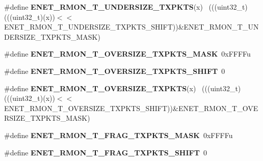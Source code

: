 \begin{DoxyCompactItemize}
\item 
\hypertarget{group___e_n_e_t___register___masks_ga293c77a598841c77f6650e48c81efbba}{}\#define {\bfseries E\+N\+E\+T\+\_\+\+R\+M\+O\+N\+\_\+\+T\+\_\+\+U\+N\+D\+E\+R\+S\+I\+Z\+E\+\_\+\+T\+X\+P\+K\+T\+S}(x)                ~(((uint32\+\_\+t)(((uint32\+\_\+t)(x))$<$$<$E\+N\+E\+T\+\_\+\+R\+M\+O\+N\+\_\+\+T\+\_\+\+U\+N\+D\+E\+R\+S\+I\+Z\+E\+\_\+\+T\+X\+P\+K\+T\+S\+\_\+\+S\+H\+I\+F\+T))\&E\+N\+E\+T\+\_\+\+R\+M\+O\+N\+\_\+\+T\+\_\+\+U\+N\+D\+E\+R\+S\+I\+Z\+E\+\_\+\+T\+X\+P\+K\+T\+S\+\_\+\+M\+A\+S\+K)\label{group___e_n_e_t___register___masks_ga293c77a598841c77f6650e48c81efbba}

\item 
\hypertarget{group___e_n_e_t___register___masks_gac24da13e75404927ddc2e7a9f1dc9134}{}\#define {\bfseries E\+N\+E\+T\+\_\+\+R\+M\+O\+N\+\_\+\+T\+\_\+\+O\+V\+E\+R\+S\+I\+Z\+E\+\_\+\+T\+X\+P\+K\+T\+S\+\_\+\+M\+A\+S\+K}~0x\+F\+F\+F\+Fu\label{group___e_n_e_t___register___masks_gac24da13e75404927ddc2e7a9f1dc9134}

\item 
\hypertarget{group___e_n_e_t___register___masks_gaa57896dafe9204df8f2d835281f03114}{}\#define {\bfseries E\+N\+E\+T\+\_\+\+R\+M\+O\+N\+\_\+\+T\+\_\+\+O\+V\+E\+R\+S\+I\+Z\+E\+\_\+\+T\+X\+P\+K\+T\+S\+\_\+\+S\+H\+I\+F\+T}~0\label{group___e_n_e_t___register___masks_gaa57896dafe9204df8f2d835281f03114}

\item 
\hypertarget{group___e_n_e_t___register___masks_ga60cf462bbd7463ebe34b0980457bf1cf}{}\#define {\bfseries E\+N\+E\+T\+\_\+\+R\+M\+O\+N\+\_\+\+T\+\_\+\+O\+V\+E\+R\+S\+I\+Z\+E\+\_\+\+T\+X\+P\+K\+T\+S}(x)                  ~(((uint32\+\_\+t)(((uint32\+\_\+t)(x))$<$$<$E\+N\+E\+T\+\_\+\+R\+M\+O\+N\+\_\+\+T\+\_\+\+O\+V\+E\+R\+S\+I\+Z\+E\+\_\+\+T\+X\+P\+K\+T\+S\+\_\+\+S\+H\+I\+F\+T))\&E\+N\+E\+T\+\_\+\+R\+M\+O\+N\+\_\+\+T\+\_\+\+O\+V\+E\+R\+S\+I\+Z\+E\+\_\+\+T\+X\+P\+K\+T\+S\+\_\+\+M\+A\+S\+K)\label{group___e_n_e_t___register___masks_ga60cf462bbd7463ebe34b0980457bf1cf}

\item 
\hypertarget{group___e_n_e_t___register___masks_ga165675b1bc4ead102b209af312a64e30}{}\#define {\bfseries E\+N\+E\+T\+\_\+\+R\+M\+O\+N\+\_\+\+T\+\_\+\+F\+R\+A\+G\+\_\+\+T\+X\+P\+K\+T\+S\+\_\+\+M\+A\+S\+K}~0x\+F\+F\+F\+Fu\label{group___e_n_e_t___register___masks_ga165675b1bc4ead102b209af312a64e30}

\item 
\hypertarget{group___e_n_e_t___register___masks_gaaab8a0b71f5d34f28a4fc9c1cefd6c21}{}\#define {\bfseries E\+N\+E\+T\+\_\+\+R\+M\+O\+N\+\_\+\+T\+\_\+\+F\+R\+A\+G\+\_\+\+T\+X\+P\+K\+T\+S\+\_\+\+S\+H\+I\+F\+T}~0\label{group___e_n_e_t___register___masks_gaaab8a0b71f5d34f28a4fc9c1cefd6c21}


\end{DoxyCompactItemize}
